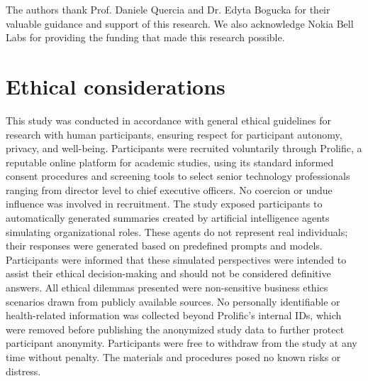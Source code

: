 \documentclass[sigconf, authorversion, nonacm, screen]{acmart}
\begin{document}
\begin{acks}
The authors thank Prof. Daniele Quercia and Dr. Edyta Bogucka for their valuable guidance and support of this research. We also acknowledge Nokia Bell Labs for providing the funding that made this research possible.
\end{acks}





\appendix

\section{Ethical considerations}

This study was conducted in accordance with general ethical guidelines for research with human participants, ensuring respect for participant autonomy, privacy, and well-being.
Participants were recruited voluntarily through Prolific, a reputable online platform for academic studies, using its standard informed consent procedures and screening tools to select senior technology professionals ranging from director level to chief executive officers. No coercion or undue influence was involved in recruitment.
The study exposed participants to automatically generated summaries created by artificial intelligence agents simulating organizational roles. These agents do not represent real individuals; their responses were generated based on predefined prompts and models. Participants were informed that these simulated perspectives were intended to assist their ethical decision-making and should not be considered definitive answers.
All ethical dilemmas presented were non-sensitive business ethics scenarios drawn from publicly available sources. 
No personally identifiable or health-related information was collected beyond Prolific’s internal IDs, which were removed before publishing the anonymized study data to further protect participant anonymity.
Participants were free to withdraw from the study at any time without penalty. The materials and procedures posed no known risks or distress.
\end{document}
